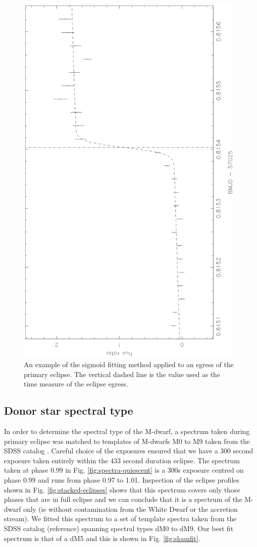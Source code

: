\documentclass[a4paper,fleqn,usenatbib]{mnras}
\begin{document}
\begin{figure}
\centering
\includegraphics[height=\columnwidth, angle=270]{images/egress.eps}
\caption[Caption for egress]{An example of the sigmoid fitting method applied to an egress of the primary eclipse. The vertical dashed line is the value used as the time measure of the eclipse egress.}
\label{fig:egress}
\end{figure}

\subsection{Donor star spectral type}
In order to determine the spectral type of the M-dwarf, a spectrum taken during primary eclipse was matched to templates of M-dwarfs M0 to M9 taken from the SDSS catalog \citep{Bochanski2007}. Careful choice of the exposures ensured that we have a 300 second exposure taken entirely within the 433 second duration eclipse. The spectrum taken at phase 0.99 in Fig. \ref{fig:spectra-quiescent} is a 300s exposure centred on phase 0.99 and runs from phase 0.97 to 1.01.  Inspection of the eclipse profiles shown in Fig. \ref{fig:stacked-eclipses} shows that this spectrum covers only those phases that are in full eclipse and we can conclude that it is a spectrum of the M-dwarf only (ie without contamination from the White Dwarf or the accretion stream). We fitted this spectrum to a set  of template spectra taken from the SDSS catalog (reference) spanning spectral types dM0 to dM9. Our best fit spectrum is that of a dM5 and this is shown in Fig. \ref{fig:sloanfit}. 
\end{document}
